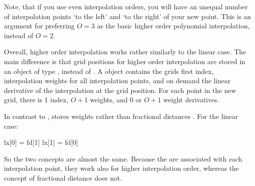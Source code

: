 Note, that if you use even interpolation orders, you will have an
unequal number of interpolation points `to the left' and `to the
right' of your new point. This is an argument for preferring $O=3$ as the
basic higher order polynomial interpolation, instead of $O=2$.

Overall, higher order interpolation works rather similarly to the
linear case.  The main difference is that grid positions for higher
order interpolation are stored in an object of type
, instead of . A
 object contains the grids first index, interpolation
weights for all interpolation points, and on demand the linear derivative of the 
interpolation at the grid position. For each point in the new grid,
there is 1 index, $O+1$ weights, and 0 or $O+1$ weight derivatives.

In contrast to ,  stores
weights  rather than fractional distances .
For the linear case:
\begin{code}
  lx[0] = fd[1]
  lx[1] = fd[0]
\end{code}

So the two concepts are almost the same.  Because the  are associated
with each interpolation point, they work also for higher interpolation
order, whereas the concept of fractional distance does not.

